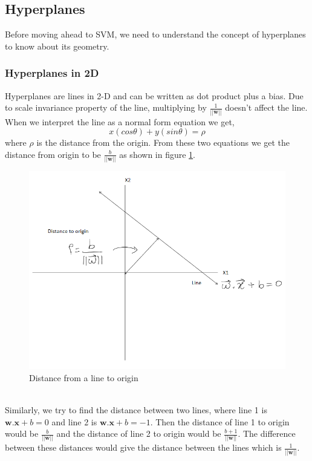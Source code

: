 \documentclass[11pt]{article}
\begin{document}
\subsection{Hyperplanes}

Before moving ahead to SVM, we need to understand the concept of hyperplanes to know about its geometry.
\subsubsection{Hyperplanes in 2D}
Hyperplanes are lines in 2-D and can be written as dot product plus a bias. Due to scale invariance property of the line, multiplying by $\frac{1}{||\mathbf{w}||}$ doesn't affect the line. When we interpret the line as a normal form equation we get,\[ x(cos\theta)+y(sin\theta)=\rho\] where $\rho$ is the distance from the origin. From these two equations we get the distance from origin to be $\frac{b}{||\mathbf{w}||}$ as shown in figure \ref{fig:fig2}.
\begin{figure}[h!]
    \centering
  \includegraphics[scale=0.7]{fig2.PNG}
  \caption{Distance from a line to origin}
  \label{fig:fig2}
\end{figure}
\\Similarly, we try to find the distance between two lines, where line 1 is $\mathbf{w}.\mathbf{x}+b=0$ and line 2 is $\mathbf{w}.\mathbf{x}+b=-1$. Then the distance of line 1 to origin would be $\frac{b}{||\mathbf{w}||}$ and the distance of line 2 to origin would be $\frac{b+1}{||\mathbf{w}||}$. The difference between these distances would give the distance between the lines which is $\frac{1}{||\mathbf{w}||}$.
\end{document}
